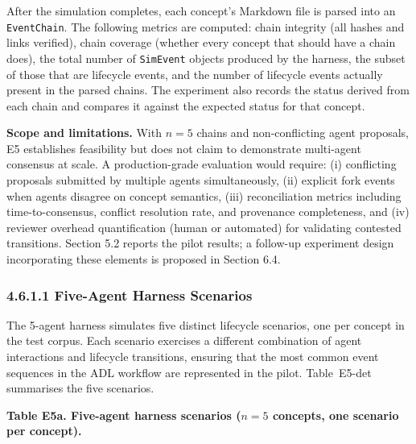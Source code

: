After the simulation completes, each concept's Markdown file is parsed into an \texttt{EventChain}. The following metrics are computed: chain integrity (all hashes and links verified), chain coverage (whether every concept that should have a chain does), the total number of \texttt{SimEvent} objects produced by the harness, the subset of those that are lifecycle events, and the number of lifecycle events actually present in the parsed chains. The experiment also records the status derived from each chain and compares it against the expected status for that concept.

\textbf{Scope and limitations.} With \(n=5\) chains and non-conflicting agent proposals, E5 establishes feasibility but does not claim to demonstrate multi-agent consensus at scale. A production-grade evaluation would require: (i) conflicting proposals submitted by multiple agents simultaneously, (ii) explicit fork events when agents disagree on concept semantics, (iii) reconciliation metrics including time-to-consensus, conflict resolution rate, and provenance completeness, and (iv) reviewer overhead quantification (human or automated) for validating contested transitions. Section 5.2 reports the pilot results; a follow-up experiment design incorporating these elements is proposed in Section 6.4.

\subsubsection{4.6.1.1 Five-Agent Harness Scenarios}\label{five-agent-harness-scenarios}

The 5-agent harness simulates five distinct lifecycle scenarios, one per concept in the test corpus. Each scenario exercises a different combination of agent interactions and lifecycle transitions, ensuring that the most common event sequences in the ADL workflow are represented in the pilot. Table~E5-det summarises the five scenarios.

\textbf{Table E5a. Five-agent harness scenarios (\(n=5\) concepts, one scenario per concept).}

